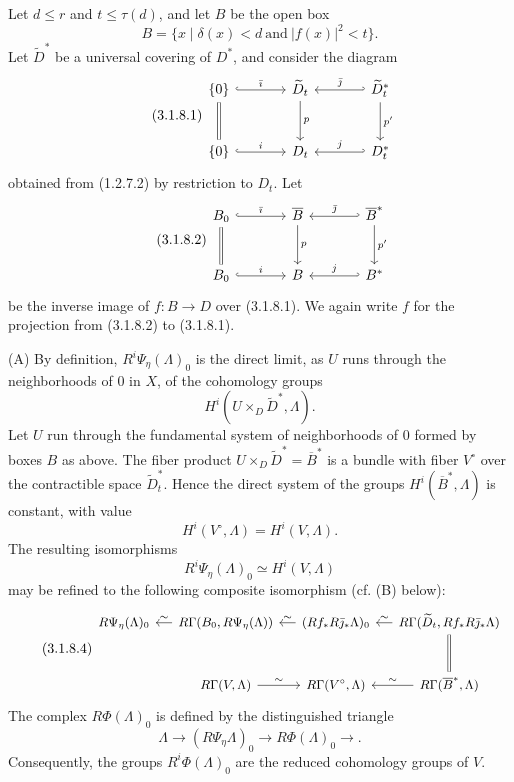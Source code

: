 Let $d\leq r$ and $t\leq\tau(d)$, and let $B$ be the open box
\[
B=\{x\mid\delta(x)<d\ \text{and}\ |f(x)|^2<t\}.
\]
Let $\widetilde D^*$ be a universal covering of $D^*$, and consider
the diagram
\begin{equation}\tag{3.1.8.1}
\begin{tikzcd}[column sep=large,row sep=large]
\{0\} \arrow[r,hook,"\bar\imath"] \arrow[d,equal]
  & \widetilde D_t \arrow[d,"p"]
  & \widetilde D_t^* \arrow[l,hook',"\bar\jmath"'] \arrow[d,"p'"] \\
\{0\} \arrow[r,hook,"i"]
  & D_t
  & D_t^* \arrow[l,hook',"j"']
\end{tikzcd}
\end{equation}
obtained from (1.2.7.2) by restriction to $D_t$.  Let
\begin{equation}\tag{3.1.8.2}
\begin{tikzcd}[column sep=large,row sep=large]
B_0 \arrow[r,hook,"\bar\imath"] \arrow[d,equal]
  & \overline B \arrow[d,"p"]
  & \overline B^* \arrow[l,hook',"\bar\jmath"'] \arrow[d,"p'"] \\
B_0 \arrow[r,hook,"i"]
  & B
  & B^* \arrow[l,hook',"j"']
\end{tikzcd}
\end{equation}
be the inverse image of $f:B\to D$ over (3.1.8.1).  We again write
$f$ for the projection from (3.1.8.2) to (3.1.8.1).

\medskip
\noindent\textup{(A)}
By definition, $R^i\Psi_\eta(\Lambda)_0$ is the direct limit, as $U$
runs through the neighborhoods of $0$ in $X$, of the cohomology groups
\[
H^i(U\times_D\widetilde D^*,\Lambda).
\]
Let $U$ run through the fundamental system of neighborhoods of $0$
formed by boxes $B$ as above.  The fiber product
$U\times_D\widetilde D^*=\overline B^*$ is a bundle with fiber
$V^\circ$ over the contractible space $\widetilde D_t^*$.  Hence the
direct system of the groups $H^i(\overline B^*,\Lambda)$ is constant,
with value
\[
H^i(V^\circ,\Lambda)=H^i(V,\Lambda).
\]
The resulting isomorphisms
\begin{equation}\tag{3.1.8.3}
R^i\Psi_\eta(\Lambda)_0\simeq H^i(V,\Lambda)
\end{equation}
may be refined to the following composite isomorphism (cf. (B)
below):
\begin{equation}\tag{3.1.8.4}
\begin{tikzcd}[column sep=small,row sep=large,cells={nodes={font=\small}}]
R\Psi_\eta(\Lambda)_0
  & R\Gamma(B_0,R\Psi_\eta(\Lambda)) \arrow[l,"\sim"']
  & (Rf_*R\bar\jmath_*\Lambda)_0 \arrow[l,"\sim"']
  & R\Gamma(\widetilde D_t,Rf_*R\bar\jmath_*\Lambda)
      \arrow[l,"\sim"'] \arrow[d,equal] \\
{}
  & R\Gamma(V,\Lambda) \arrow[r,"\sim"]
  & R\Gamma(V^\circ,\Lambda)
  & R\Gamma(\overline B^*,\Lambda) \arrow[l,"\sim"']
\end{tikzcd}
\end{equation}
The complex $R\Phi(\Lambda)_0$ is defined by the distinguished
triangle
\[
\Lambda\longrightarrow(R\Psi_\eta\Lambda)_0
\longrightarrow R\Phi(\Lambda)_0\longrightarrow{}.
\]
Consequently, the groups $R^i\Phi(\Lambda)_0$ are the reduced
cohomology groups of $V$.

